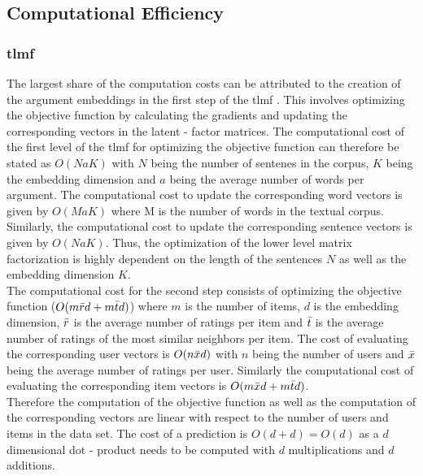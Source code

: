 \subsection{Computational Efficiency}
\label{chap:efficiency}
\subsubsection{\acrshort{tlmf}}
The largest share of the computation costs can be attributed to the creation of the argument embeddings in the first step of the \acrshort{tlmf} \cite{li2016two}. This involves optimizing the objective function by calculating the gradients and updating the corresponding vectors in the latent - factor matrices. The computational cost of the first level of the \acrshort{tlmf} for optimizing the objective function can therefore be stated as $O(N a K)$ with $N$ being the number of sentenes in the corpus, $K$ being the embedding dimension and $a$ being the average number of words per argument. The computational cost to update the corresponding word vectors is given by $O(M a K)$ where M is the number of words in the textual corpus. Similarly, the computational cost to update the corresponding sentence vectors is given by $O(N a K)$. Thus, the optimization of the lower level matrix factorization is highly dependent on the length of the sentences $N$ as well as the embedding dimension $K$.\\
The computational cost for the second step consists of optimizing the objective function ($O(m\Bar{r}d + m\Bar{t}d)$) where $m$ is the number of items, $d$ is the embedding dimension,
$\Bar{r}$ is the average number of ratings per item and $\Bar{t}$ is the average number of ratings of the most similar neighbors per item. The cost of evaluating the corresponding user vectors is $O(n\Bar{x}d)$ with $n$ being the number of users and $\Bar{x}$ being the average number of ratings per user. Similarly the computational cost of evaluating the corresponding item vectors is $O(m\Bar{x}d + m\Bar{t}d)$.\\ Therefore the computation of the objective function as well as the computation of the corresponding vectors are linear with respect to the number of users and items in the data set. The cost of a prediction is $O(d + d) = O(d)$ as a $d$ dimensional dot - product needs to be computed with $d$ multiplications and $d$ additions.

